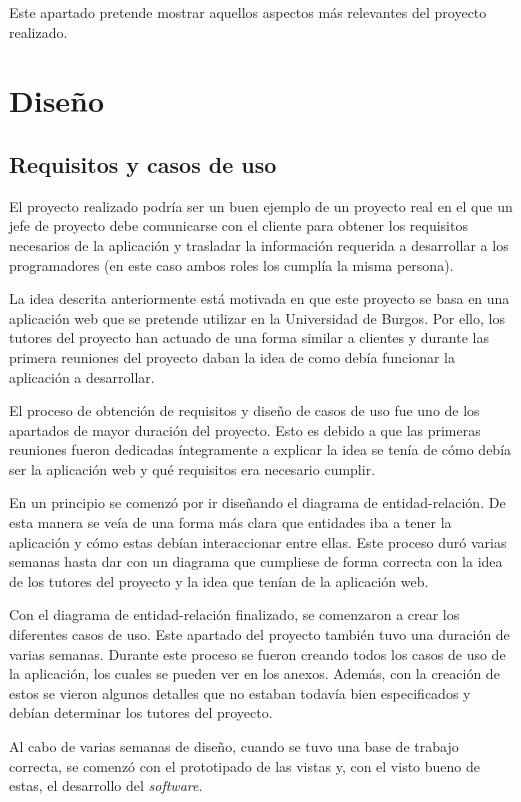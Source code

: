 
Este apartado pretende mostrar aquellos aspectos más relevantes del proyecto realizado.

\section{Diseño}
\subsection{Requisitos y casos de uso}
El proyecto realizado podría ser un buen ejemplo de un proyecto real en el que un jefe de proyecto debe comunicarse con el cliente para obtener los requisitos necesarios de la aplicación y trasladar la información requerida a desarrollar a los programadores (en este caso ambos roles los cumplía la misma persona).

La idea descrita anteriormente está motivada en que este proyecto se basa en una aplicación web que se pretende utilizar en la Universidad de Burgos. 
Por ello, los tutores del proyecto han actuado de una forma similar a clientes y durante las primera reuniones del proyecto daban la idea de como debía funcionar la aplicación a desarrollar.

El proceso de obtención de requisitos y diseño de casos de uso fue uno de los apartados de mayor duración del proyecto.
Esto es debido a que las primeras reuniones fueron dedicadas íntegramente a explicar la idea se tenía de cómo debía ser la aplicación web y qué requisitos era necesario cumplir.

En un principio se comenzó por ir diseñando el diagrama de entidad-relación.
De esta manera se veía de una forma más clara que entidades iba a tener la aplicación y cómo estas debían interaccionar entre ellas.
Este proceso duró varias semanas hasta dar con un diagrama que cumpliese de forma correcta con la idea de los tutores del proyecto y la idea que tenían de la aplicación web.

Con el diagrama de entidad-relación finalizado, se comenzaron a crear los diferentes casos de uso.
Este apartado del proyecto también tuvo una duración de varias semanas.
Durante este proceso se fueron creando todos los casos de uso de la aplicación, los cuales se pueden ver en los anexos.
Además, con la creación de estos se vieron algunos detalles que no estaban todavía bien especificados y debían determinar los tutores del proyecto.

Al cabo de varias semanas de diseño, cuando se tuvo una base de trabajo correcta, se comenzó con el prototipado de las vistas y, con el visto bueno de estas, el desarrollo del \textit{software}.

